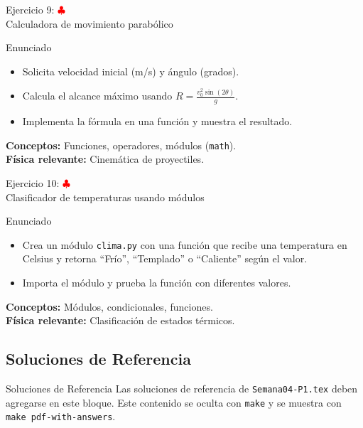 \documentclass[10pt]{beamer}
\begin{document}
\begin{frame}{Ejercicio 9: \hfill \textcolor{red}{$\clubsuit$} \\ Calculadora de movimiento parabólico}
  \begin{block}{Enunciado}
    \begin{itemize}
      \item Solicita velocidad inicial (m/s) y ángulo (grados).
      \item Calcula el alcance máximo usando \(R = \frac{v_0^2 \sin(2\theta)}{g}\).
      \item Implementa la fórmula en una función y muestra el resultado.
    \end{itemize}
  \end{block}
  \textbf{Conceptos:} Funciones, operadores, módulos (\texttt{math}).\\
  \textbf{Física relevante:} Cinemática de proyectiles.
\end{frame}

\begin{frame}{Ejercicio 10: \hfill \textcolor{red}{$\clubsuit$} \\ Clasificador de temperaturas usando módulos}
  \begin{block}{Enunciado}
    \begin{itemize}
      \item Crea un módulo \texttt{clima.py} con una función que recibe una temperatura en Celsius y retorna “Frío”, “Templado” o “Caliente” según el valor.
      \item Importa el módulo y prueba la función con diferentes valores.
    \end{itemize}
  \end{block}
  \textbf{Conceptos:} Módulos, condicionales, funciones.\\
  \textbf{Física relevante:} Clasificación de estados térmicos.
\end{frame}

\begin{solutionblock}
\section{Soluciones de Referencia}

\begin{frame}{Soluciones de Referencia}
  \small
  Las soluciones de referencia de \texttt{Semana04-P1.tex} deben agregarse en
  este bloque. Este contenido se oculta con \texttt{make} y se muestra con
  \texttt{make pdf-with-answers}.
\end{frame}
\end{solutionblock}
\end{document}
